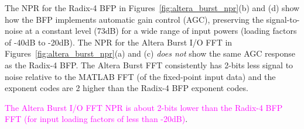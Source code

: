 The NPR for the Radix-4 BFP in Figures~\ref{fig:altera_burst_npr}(b) and (d)
show how the BFP implements automatic gain control (AGC), preserving the
signal-to-noise at a constant level (73dB) for a wide range of input powers
(loading factors of -40dB to -20dB).
%
The NPR for the Altera Burst I/O FFT in Figures~\ref{fig:altera_burst_npr}(a)
and (c) \emph{does not} show the same AGC response as the Radix-4 BFP.
The Altera Burst FFT consistently has 2-bits less signal to noise relative
to the MATLAB FFT (of the fixed-point input data) and the exponent codes
are 2 higher than the Radix-4 BFP exponent codes.

\textcolor{magenta}{The Altera Burst I/O FFT NPR is about 2-bits lower than the
Radix-4 BFP FFT (for input loading factors of less than -20dB)}.